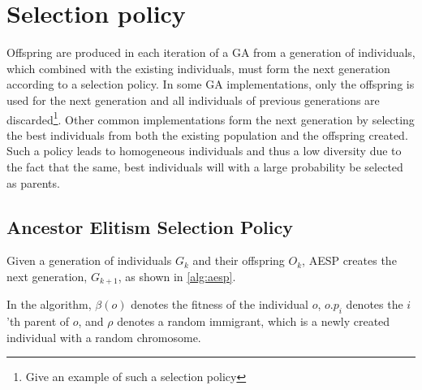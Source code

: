 \section{Selection policy}
Offspring are produced in each iteration of a GA from a generation of individuals, which combined with the existing individuals, must form the next generation according to a selection policy. In some GA implementations, only the offspring is used for the next generation and all individuals of previous generations are discarded\footnote{ Give an example of such a selection policy}. Other common implementations form the next generation by selecting the best individuals from both the existing population and the offspring created\cite{masterThesisGANN}. Such a policy leads to homogeneous individuals and thus a low diversity due to the fact that the same, best individuals will with a large probability be selected as parents.

\subsection{Ancestor Elitism Selection Policy}
Given a generation of individuals $G_k$ and their offspring $O_k$, AESP creates the next generation, $G_{k+1}$, as shown in \cref{alg:aesp}.
%

%
In the algorithm, $\beta(o)$ denotes the fitness of the individual $o$, $o.p_i$ denotes the $i$'th parent of $o$, and $\rho$ denotes a random immigrant, which is a newly created individual with a random chromosome.
